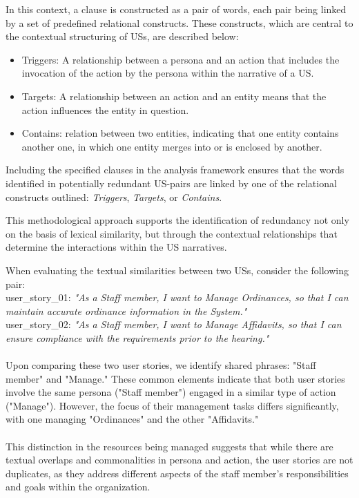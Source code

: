 \begin{definition}
	In this context, a clause is constructed as a pair of words, each pair being linked by a set of predefined relational constructs. These constructs, which are central to the contextual structuring of USs, are described below:
	\begin{itemize}
		
		\item Triggers: A relationship between a persona and an action that includes the invocation of the action by the persona within the narrative of a US.
		
		\item Targets: A relationship between an action and an entity means that the action influences the entity in question.
		
		\item Contains: relation between two entities, indicating that one entity contains another one, in which one entity merges into or is enclosed by another. 
		
	\end{itemize}
	Including the specified clauses in the analysis framework ensures that the words identified in potentially redundant US-pairs are linked by one of the relational constructs outlined: \textit{Triggers}, \textit{Targets}, or \textit{Contains}. 
	
	This methodological approach supports the identification of redundancy not only on the basis of lexical similarity, but through the contextual relationships that determine the interactions within the US narratives.
\end{definition}
\begin{example}
	When evaluating the textual similarities between two USs, consider the following pair: \\
	user\_story\_01: \textit{"As a Staff member, I want to Manage Ordinances, so that I can maintain accurate ordinance information in the System."}\\
	user\_story\_02: \textit{"As a Staff member, I want to Manage Affidavits, so that I can ensure compliance with the requirements prior to the hearing."} \\\\
	Upon comparing these two user stories, we identify shared phrases: "Staff member" and "Manage." These common elements indicate that both user stories involve the same persona ("Staff member") engaged in a similar type of action ("Manage"). However, the focus of their management tasks differs significantly, with one managing "Ordinances" and the other "Affidavits."\\\\
	This distinction in the resources being managed suggests that while there are textual overlaps and commonalities in persona and action, the user stories are not duplicates, as they address different aspects of the staff member's responsibilities and goals within the organization.
\end{example}
